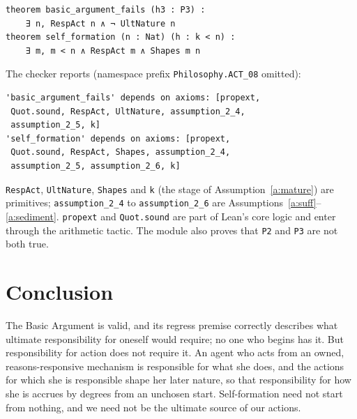 \documentclass{situationist-preprint}
\begin{document}
\begin{lstlisting}
theorem basic_argument_fails (h3 : P3) :
    ∃ n, RespAct n ∧ ¬ UltNature n
theorem self_formation (n : Nat) (h : k < n) :
    ∃ m, m < n ∧ RespAct m ∧ Shapes m n
\end{lstlisting}

The checker reports (namespace prefix \texttt{Philosophy.ACT\_08} omitted):

\begin{lstlisting}
'basic_argument_fails' depends on axioms: [propext,
 Quot.sound, RespAct, UltNature, assumption_2_4,
 assumption_2_5, k]
'self_formation' depends on axioms: [propext,
 Quot.sound, RespAct, Shapes, assumption_2_4,
 assumption_2_5, assumption_2_6, k]
\end{lstlisting}

\texttt{RespAct}, \texttt{UltNature}, \texttt{Shapes} and \texttt{k} (the stage of Assumption~\ref{a:mature}) are primitives; \texttt{assumption\_2\_4} to \texttt{assumption\_2\_6} are Assumptions~\ref{a:suff}--\ref{a:sediment}. \texttt{propext} and \texttt{Quot.sound} are part of Lean's core logic and enter through the arithmetic tactic. The module also proves that \texttt{P2} and \texttt{P3} are not both true.

\section{Conclusion}

The Basic Argument is valid, and its regress premise correctly describes what ultimate responsibility for oneself would require; no one who begins has it. But responsibility for action does not require it. An agent who acts from an owned, reasons-responsive mechanism is responsible for what she does, and the actions for which she is responsible shape her later nature, so that responsibility for how she is accrues by degrees from an unchosen start. Self-formation need not start from nothing, and we need not be the ultimate source of our actions.
\end{document}
